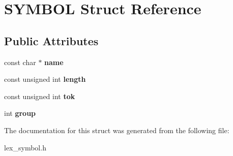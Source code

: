 \hypertarget{structSYMBOL}{}\section{S\+Y\+M\+B\+OL Struct Reference}
\label{structSYMBOL}
\subsection*{Public Attributes}
\begin{DoxyCompactItemize}
\item 
\mbox{\label{structSYMBOL_af5d2c3ac5fecd17e843d2550a5d0586b}} 
const char $\ast$ {\bfseries name}
\item 
\mbox{\label{structSYMBOL_a1691fb1aa36ad9979a20eba36e56b003}} 
const unsigned int {\bfseries length}
\item 
\mbox{\label{structSYMBOL_a70485ad8213014ab476f4d1bd8c72b9c}} 
const unsigned int {\bfseries tok}
\item 
\mbox{\label{structSYMBOL_a7d06ea23f7e157eeb91515a01b2c773b}} 
int {\bfseries group}
\end{DoxyCompactItemize}


The documentation for this struct was generated from the following file\+:\begin{DoxyCompactItemize}
\item 
lex\+\_\+symbol.\+h\end{DoxyCompactItemize}
